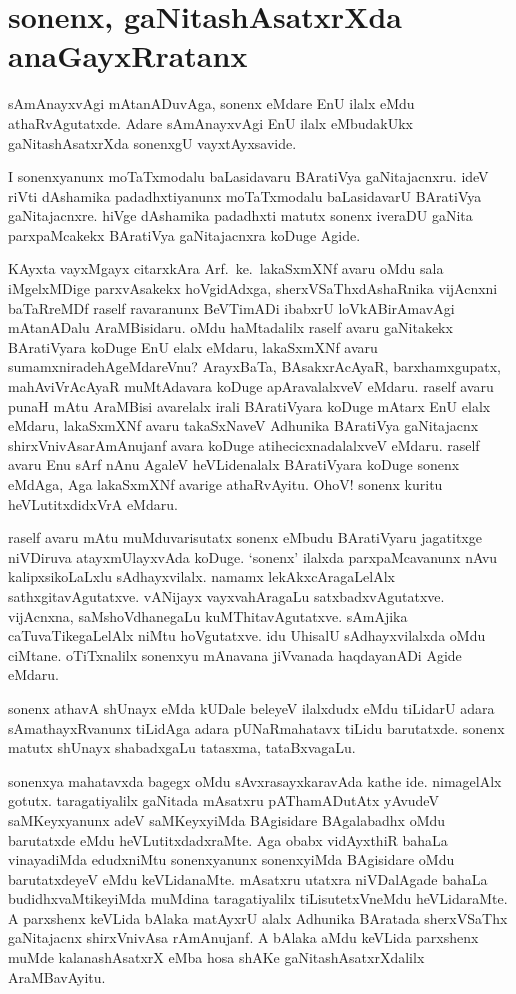 \chapter{sonenx, gaNitashAsatxrXda anaGayxRratanx}
\vskip -20pt

sAmAnayxvAgi mAtanADuvAga, sonenx eMdare EnU ilalx eMdu athaRvAgutatxde. Adare sAmAnayxvAgi EnU ilalx eMbudakUkx gaNitashAsatxrXda sonenxgU vayxtAyxsavide.

I sonenxyanunx moTaTxmodalu baLasidavaru BAratiVya gaNitajacnxru. ideV riVti dAshamika padadhxtiyanunx moTaTxmodalu baLasidavarU BAratiVya gaNitajacnxre. hiVge dAshamika padadhxti matutx sonenx iveraDU gaNita parxpaMcakekx BAratiVya gaNitajacnxra koDuge Agide.

KAyxta vayxMgayx citarxkAra Arf.~ke.\ lakaSxmXNf avaru oMdu sala iMgelxMDige parxvAsakekx hoVgidAdxga, sherxVSaThxdAshaRnika vijAcnxni baTaRreMDf raself ravaranunx BeVTimADi ibabxrU loVkABirAmavAgi mAtanADalu AraMBisidaru. oMdu haMtadalilx raself avaru gaNitakekx BAratiVyara koDuge EnU elalx eMdaru, lakaSxmXNf avaru sumamxnirade\-hAgeMdareVnu? ArayxBaTa, BAsakxrAcAyaR, barxhamxgupatx, mahAviVrAcAyaR muMtA\-davara koDuge apAravalalxveV eMdaru. raself avaru punaH mAtu AraMBisi avarelalx irali BAratiVyara koDuge mAtarx EnU elalx eMdaru, lakaSxmXNf avaru takaSxNaveV Adhunika BAratiVya gaNitajacnx shirxVnivAsarAmAnujanf avara koDuge atihecicxnadalalxveV \-eMdaru. raself avaru Enu sArf nAnu AgaleV heVLidenalalx BAratiVyara koDuge \-sonenx eMdAga, Aga lakaSxmXNf avarige athaRvAyitu. OhoV! sonenx kuritu heVLutitxdidxVrA eMdaru.

raself avaru mAtu muMduvarisutatx sonenx eMbudu BAratiVyaru jagatitxge niVDiruva atayxmUlayxvAda koDuge. `sonenx' ilalxda parxpaMcavanunx nAvu kalipxsikoLaLxlu sAdhayxvilalx. namamx lekAkxcAragaLelAlx sathxgitavAgutatxve. vANijayx vayxvahAragaLu satxbadxvAgu\-tatxve. vijAcnxna, saMshoVdhanegaLu kuMThitavAgutatxve. sAmAjika caTuvaTikegaLelAlx niMtu hoVgutatxve. idu UhisalU sAdhayxvilalxda oMdu ciMtane. oTiTxnalilx sonenxyu mAnavana jiVvanada haqdayanADi Agide eMdaru. 

sonenx athavA shUnayx eMda kUDale beleyeV ilalxdudx eMdu tiLidarU adara sAmathayxRvanunx tiLidAga adara pUNaRmahatavx tiLidu barutatxde. sonenx matutx shUnayx shabadxgaLu tatasxma, tataBxvagaLu.

sonenxya mahatavxda bagegx oMdu sAvxrasayxkaravAda kathe ide. nimagelAlx gotutx. taragatiyalilx gaNitada mAsatxru pAThamADutAtx yAvudeV saMKeyxyanunx adeV saMKeyxyiMda BAgisidare BAgalabadhx oMdu barutatxde eMdu heVLutitxdadxraMte. Aga obabx \-vidAyxthiR bahaLa vinayadiMda edudxniMtu sonenxyanunx sonenxyiMda BAgisidare oMdu barutatxdeyeV eMdu keVLidanaMte. mAsatxru utatxra niVDalAgade bahaLa budidhx\-vaMtikeyiMda muMdina taragatiyalilx tiLisutetxVneMdu heVLidaraMte. A parxshenx keVLida bAlaka matAyxrU alalx Adhunika BAratada sherxVSaThx gaNitajacnx shirxVnivAsa rAmAnujanf. A bAlaka aMdu keVLida parxshenx muMde kalanashAsatxrX eMba hosa shAKe \-gaNitashAsatxrXdalilx AraMBavAyitu.

